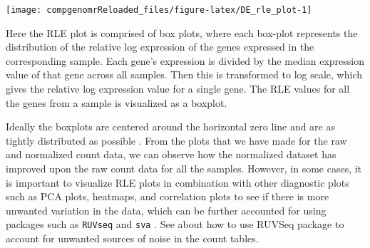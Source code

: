 \documentclass[12pt,]{krantz}
\newenvironment{Shaded}{\begin{snugshade}}{\end{snugshade}}
\newcommand{\DataTypeTok}[1]{\textcolor[rgb]{0.13,0.29,0.53}{#1}}
\newcommand{\DecValTok}[1]{\textcolor[rgb]{0.00,0.00,0.81}{#1}}
\newcommand{\KeywordTok}[1]{\textcolor[rgb]{0.13,0.29,0.53}{\textbf{#1}}}
\newcommand{\NormalTok}[1]{#1}
\newcommand{\OperatorTok}[1]{\textcolor[rgb]{0.81,0.36,0.00}{\textbf{#1}}}
\newcommand{\OtherTok}[1]{\textcolor[rgb]{0.56,0.35,0.01}{#1}}
\newcommand{\StringTok}[1]{\textcolor[rgb]{0.31,0.60,0.02}{#1}}
\begin{document}
\begin{Shaded}
\end{Shaded}

\begin{center}\texttt{[image: compgenomrReloaded\_files/figure-latex/DE\_rle\_plot-1]} \end{center}

Here the RLE plot is comprised of box plots, where each box-plot represents the distribution of the relative log expression of the genes expressed in the corresponding sample. Each gene's expression is divided by the median expression value of that gene across all samples. Then this is transformed to log scale, which gives the relative log expression value for a single gene. The RLE values for all the genes from a sample is visualized as a boxplot.

Ideally the boxplots are centered around the horizontal zero line and are as tightly distributed as possible \citep{risso_normalization_2014}. From the plots that we have made for the raw and normalized count data, we can observe how the normalized dataset has improved upon the raw count data for all the samples. However, in some cases, it is important to visualize RLE plots in combination with other diagnostic plots such as PCA plots, heatmaps, and correlation plots to see if there is more unwanted variation in the data, which can be further accounted for using packages such as \texttt{RUVseq} \citep{risso_normalization_2014} and \texttt{sva} \citep{leek_sva_2012}. See about how to use RUVSeq package to account for unwanted sources of noise in the count tables.
\end{document}
